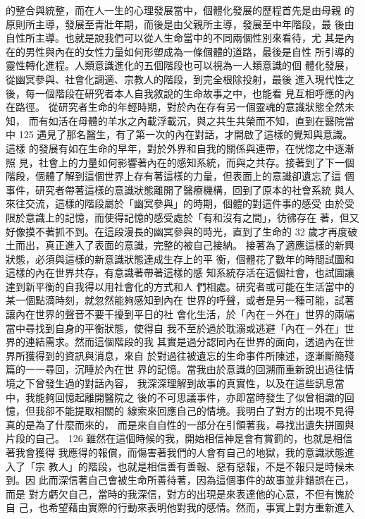 的整合與統整，而在人一生的心理發展當中，個體化發展的歷程首先是由母親
的原則所主導，發展至青壯年期，而後是由父親所主導，發展至中年階段，最
後由自性所主導。也就是說我們可以從人生命當中的不同兩個性別來看待，尤
其是內在的男性與內在的女性力量如何形塑成為一條個體的道路，最後是自性
所引導的靈性轉化進程。人類意識進化的五個階段也可以視為一人類意識的個
體化發展，從幽冥參與、社會化調適、宗教人的階段，到完全根除投射，最後
進入現代性之後，每一個階段在研究者本人自我敘說的生命故事之中，也能看
見互相呼應的內在路徑。 
從研究者生命的年輕時期，對於內在存有另一個靈魂的意識狀態全然未知，
而有如活在母體的羊水之內載浮載沉，與之共生共榮而不知，直到在醫院當中
125 
遇見了那名醫生，有了第一次的內在對話，才開啟了這樣的覺知與意識。這樣
的發展有如在生命的早年，對於外界和自我的關係與連帶，在恍惚之中逐漸照
見，社會上的力量如何影響著內在的感知系統，而與之共存。接著到了下一個
階段，個體了解到這個世界上存有著這樣的力量，但表面上的意識卻遺忘了這
個事件，研究者帶著這樣的意識狀態離開了醫療機構，回到了原本的社會系統
與人來往交流，這樣的階段屬於「幽冥參與」的時期，個體的對這件事的感受
由於受限於意識上的記憶，而使得記憶的感受處於「有和沒有之間」，彷彿存在
著，但又好像摸不著抓不到。在這段漫長的幽冥參與的時光，直到了生命的 32
歲才再度破土而出，真正進入了表面的意識，完整的被自己接納。 
接著為了適應這樣的新興狀態，必須與這樣的新意識狀態達成生存上的平
衡，個體花了數年的時間試圖和這樣的內在世界共存，有意識著帶著這樣的感
知系統存活在這個社會，也試圖讓達到新平衡的自我得以用社會化的方式和人
們相處。研究者或可能在生活當中的某一個點滴時刻，就忽然能夠感知到內在
世界的呼聲，或者是另一種可能，試著讓內在世界的聲音不要干擾到平日的社
會化生活，於「內在－外在」世界的兩端當中尋找到自身的平衡狀態，使得自
我不至於過於耽溺或逃避「內在－外在」世界的連結需求。然而這個階段的我
其實是過分認同內在世界的面向，透過內在世界所獲得到的資訊與消息，來自
於對過往被遺忘的生命事件所陳述，逐漸斷簡殘篇的一一尋回，沉睡於內在世
界的記憶。當我由於意識的回溯而重新說出過往情境之下曾發生過的對話內容，
我深深理解到故事的真實性，以及在這些訊息當中，我能夠回憶起離開醫院之
後的不可思議事件，亦即當時發生了似曾相識的回憶，但我卻不能提取相關的
線索來回應自己的情境。我明白了對方的出現不見得真的是為了什麼而來的，
而是來自自性的一部分在引領著我，尋找出遺失拼圖與片段的自己。 
126 
雖然在這個時候的我，開始相信神是會有賞罰的，也就是相信著我會獲得
我應得的報償，而傷害著我們的人會有自己的地獄，我的意識狀態進入了「宗
教人」的階段，也就是相信善有善報、惡有惡報，不是不報只是時候未到。因
此而深信著自己會被生命所善待著，因為這個事件的故事並非錯誤在己，而是
對方虧欠自己，當時的我深信，對方的出現是來表達他的心意，不但有愧於自
己，也希望藉由實際的行動來表明他對我的感情。然而，事實上對方重新進入
